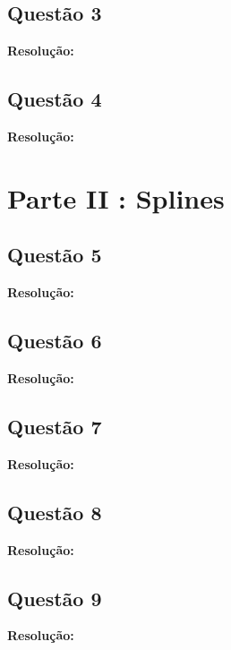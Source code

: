\documentclass[12pt]{article}
\begin{document}
\subsection{Questão 3}
\label{subsec:p1q3}

\textbf{Resolução:}

\subsection{Questão 4}
\label{subsec:p1q4}

\textbf{Resolução:}

\section{Parte II : Splines}
\label{sec:parte2}

\subsection{Questão 5}
\label{subsec:p2q5}

\textbf{Resolução:}

\subsection{Questão 6}
\label{subsec:p2q6}

\textbf{Resolução:}

\subsection{Questão 7}
\label{subsec:p2q7}

\textbf{Resolução:}

\subsection{Questão 8}
\label{subsec:p2q8}

\textbf{Resolução:}

\subsection{Questão 9}
\label{subsec:p2q9}

\textbf{Resolução:}
\end{document}
